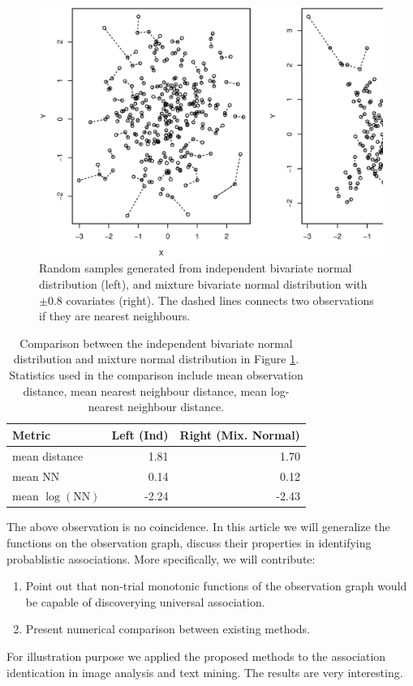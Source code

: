 \documentclass{sig-alternate}
\begin{document}
\begin{figure}[t]
  \centering
  \includegraphics[width=.5\textwidth,height=.25\textwidth]{../code/visualize/plot/example-1.eps}
  \caption{Random samples generated from independent bivariate normal
    distribution (left), and mixture bivariate normal distribution
    with $\pm 0.8$ covariates (right). The dashed lines connects two
    observations if they are nearest neighbours.}
  \label{fig:comparison}
\end{figure}

\begin{table}[ht]
  \centering
  \begin{tabular}{lrr}
    \hline
    Metric & Left (Ind) & Right (Mix. Normal) \\ 
    \hline
    mean distance & 1.81 & 1.70 \\ 
    mean NN & 0.14 & 0.12 \\ 
    mean $\log(\textrm{NN})$ & -2.24 & -2.43 \\ 
    \hline
  \end{tabular}
  \caption{Comparison between the independent bivariate normal
    distribution and mixture normal distribution in Figure
    \ref{fig:comparison}.  Statistics used in the comparison include
    mean observation distance, mean nearest neighbour distance, mean
    log-nearest neighbour distance. }
  \label{tab:example-compare}
\end{table}

The above observation is no coincidence. In this article we will
generalize the functions on the observation graph, discuss their
properties in identifying probablistic associations. More
specifically, we will contribute:
\begin{enumerate}
\item Point out that non-trial monotonic functions of the observation
  graph would be capable of discoverying universal association.
\item Present numerical comparison between existing methods.
\end{enumerate}
For illustration purpose we applied the proposed methods to the
association identication in image analysis and text mining. The
results are very interesting.
\end{document}
